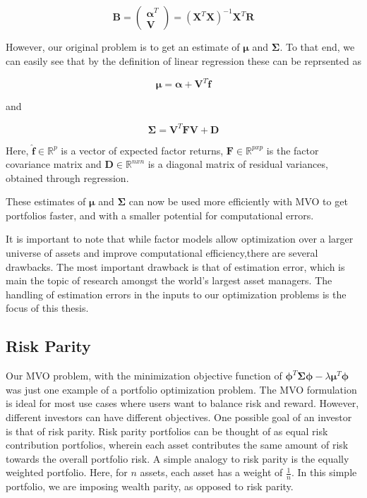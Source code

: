 \documentclass[12pt]{article}
\begin{document}
\begin{equation}
\boldsymbol{B} = \begin{pmatrix} \boldsymbol{\alpha}^T \\\boldsymbol{V} \end{pmatrix} = (\boldsymbol{X}^T\boldsymbol{X})^{-1} \boldsymbol{X}^T\boldsymbol{R}
\end{equation}

However, our original problem is to get an estimate of $\boldsymbol{\mu}$ and $\boldsymbol{\Sigma}$. To that end, we can easily see that by the definition of linear regression these can be reprsented as

\begin{equation}
\boldsymbol{\mu} = \boldsymbol{\alpha} + \boldsymbol{V}^T\boldsymbol{\hat{f}}
\end{equation}

and

\begin{equation}
\boldsymbol{\Sigma} = \boldsymbol{V}^T \boldsymbol{F} \boldsymbol{V} + \boldsymbol{D}
\end{equation}

Here,  $\boldsymbol{\hat{f}} \in \mathbb{R}^p$ is a vector of expected factor returns, $\boldsymbol{F} \in \mathbb{R}^{pxp}$ is the factor covariance matrix and $\boldsymbol{D} \in \mathbb{R}^{nxn}$ is a diagonal matrix of residual variances, obtained through regression.

These estimates of $\boldsymbol{\mu}$ and $\boldsymbol{\Sigma}$ can now be used more efficiently with MVO to get portfolios faster, and with a smaller potential for computational errors.

It is important to note that while factor models allow optimization over a larger universe of assets and improve computational efficiency,there are several drawbacks. The most important drawback is that of estimation error, which is main the topic of research amongst the world's largest asset managers.  The handling of estimation errors in the inputs to our optimization problems is the focus of this thesis.

\subsection{Risk Parity}
Our MVO problem, with the minimization objective function of $\boldsymbol{\phi}^T \boldsymbol{\Sigma} \boldsymbol{\phi} - \lambda \boldsymbol{\mu}^T \boldsymbol{\phi}$ was just one example of a portfolio optimization problem. The MVO formulation is ideal for most use cases where users want to balance risk and reward. However,  different investors can have different objectives.  One possible goal of an investor is that of risk parity. Risk parity portfolios can be thought of as equal risk contribution portfolios, wherein each asset contributes the same amount of risk towards the overall portfolio risk. A simple analogy to risk parity is the equally weighted portfolio. Here, for $n$ assets, each asset has a weight of $\frac{1}{n}$. In this simple portfolio, we are imposing wealth parity, as opposed to risk parity.
\end{document}
